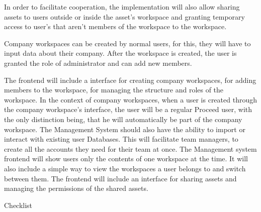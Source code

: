 In order to facilitate cooperation, 
the implementation will also allow sharing assets to users outside or inside the asset's workspace and granting temporary access to user's that aren't members of the workspace to the workspace.

Company workspaces can be created by normal users, for this, they will have to input data about their company. After the workspace is created, the user is granted the role of administrator and can add new members.

The frontend will include a interface for creating company workspaces, for adding members to the workspace, for managing the structure and roles of the workspace.
In the context of company workspaces, when a user is created through the company workspace's interface, the user will be a regular Proceed user, with the only distinction being, that he will automatically be part of the company workspace.
The Management System should also have the ability to import or interact with existing user Databases.
This will facilitate team managers, to create all the accounts they need for their team at once.
The Management system frontend will show users only the contents of one workspace at the time. It will also include a simple way to view the workspaces a user belongs to and switch between them.
The frontend will include an interface for sharing assets and managing the permissions of the shared assets.

Checklist

